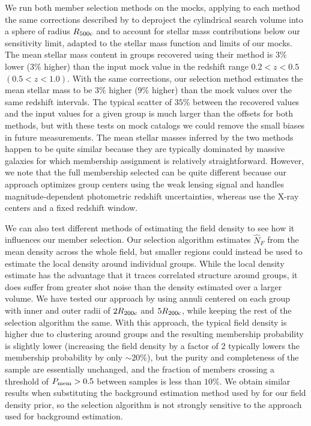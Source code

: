 We run both member selection methods on the mocks, applying
to each method the same corrections described by \citet{Giodini2009}
to deproject the cylindrical search volume into a sphere of radius
$R_{500\rm{c}}$ and to account for stellar mass contributions below
our sensitivity limit, adapted to the stellar mass function and limits
of our mocks. The mean stellar mass content in groups recovered using
their method is $3\%$ lower ($3\%$ higher) than the input mock value
in the redshift range $0.2<z<0.5$ $(0.5<z<1.0)$. With the same
corrections, our selection method estimates the mean stellar mass to be $3\%$
higher ($9\%$ higher) than the mock values over the same redshift
intervals. The typical scatter of $35\%$ between the recovered values and the
input values for a given group is much larger than the offsets for
both methods, but with these tests on mock catalogs we could remove
the small biases in future measurements. The mean stellar masses
inferred by the two methods happen to be quite similar because they
are typically dominated by massive galaxies for which membership
assignment is relatively straightforward. However, we note
that the full membership selected can be quite different because our approach
optimizes group centers using the weak lensing signal and handles
magnitude-dependent photometric redshift uncertainties, whereas
\citet{Giodini2009} use the X-ray centers and a fixed redshift window. 

We can also test different methods of estimating the field density to
see how it influences our member selection.
Our selection algorithm estimates $\hat{N}_{F}$ from the mean density
across the whole field, but smaller regions could instead be used to
estimate the local density around individual groups. While the local
density estimate has the advantage that it traces correlated structure
around groups, it does suffer from greater shot noise than the density
estimated over a larger volume. We have tested our approach
by using annuli centered on each group with inner and outer radii of
$2\mbox{$R_{200\rm{c}}$}$ and $5\mbox{$R_{200\rm{c}}$}$, while keeping the rest of the selection
algorithm the same. With this approach, the typical field density is
higher due to clustering around groups and the resulting membership probability
is slightly lower (increasing the field density by a factor of 2 typically
lowers the membership probability by only $\sim20\%$), but the purity and
completeness of the sample are essentially unchanged, and the fraction
of members crossing a threshold of $P_{\rm mem}>0.5$ between samples
is less than $10\%$. We obtain
similar results when substituting the background estimation method
used by \citet{Giodini2009} for our field density prior, so the
selection algorithm is not strongly sensitive to the approach used for
background estimation.

